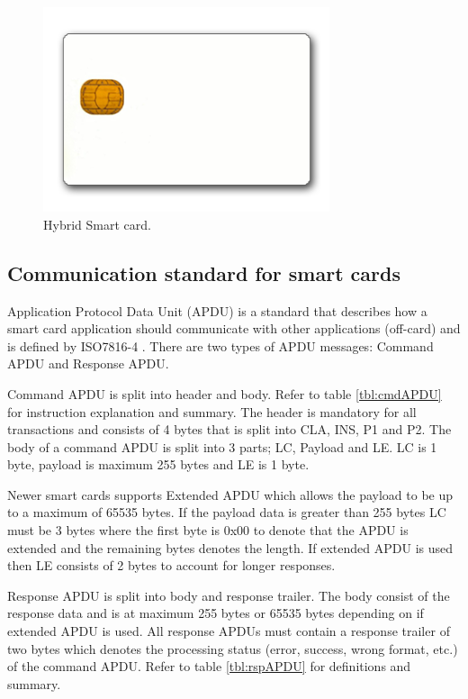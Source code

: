 \begin{figure}[h!]
  \caption{Hybrid Smart card.}
  \label{fig:nfccard}
  \centering
    \includegraphics[width=0.75\textwidth]{images/nfccard2.png}
\end{figure}

\subsection{Communication standard for smart cards}
\label{sec:communicationstandard}
Application Protocol Data Unit (APDU) is a standard that describes how a smart card application should communicate with other applications (off-card) and is defined by ISO7816-4 \cite{iso7816-4}. There are two types of APDU messages: Command APDU and Response APDU.

Command APDU is split into header and body. Refer to table \ref{tbl:cmdAPDU} for instruction explanation and summary. The header is mandatory for all transactions and consists of 4 bytes that is split into CLA, INS, P1 and P2. The body of a command APDU is split into 3 parts; LC, Payload and LE. LC is 1 byte, payload is maximum 255 bytes and LE is 1 byte.

Newer smart cards supports Extended APDU which allows the payload to be up to a maximum of 65535 bytes. If the payload data is greater than 255 bytes LC must be 3 bytes where the first byte is 0x00 to denote that the APDU is extended and the remaining bytes denotes the length. If extended APDU is used then LE consists of 2 bytes to account for longer responses.


Response APDU is split into body and response trailer. The body consist of the response data and is at maximum 255 bytes or 65535 bytes depending on if extended APDU is used. All response APDUs must contain a response trailer of two bytes which denotes the processing status (error, success, wrong format, etc.) of the command APDU. Refer to table \ref{tbl:rspAPDU} for definitions and summary.


